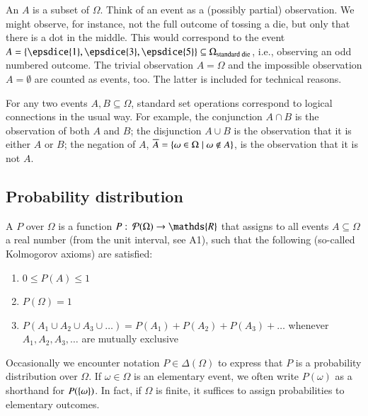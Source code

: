 \documentclass[nobib,nofonts]{tufte-handout}
\begin{document}
An  $A$ is a subset of $\Omega$. Think of an event as a (possibly partial)
observation. We might observe, for instance, not the full outcome of tossing a die, but only
that there is a dot in the middle. This would correspond to the event
$A = \set{\epsdice{1}, \epsdice{3}, \epsdice{5}} \subseteq \Omega_{\text{standard die}}$,
i.e., observing an odd numbered outcome. The trivial observation $A = \Omega$ and the
impossible observation $A = \emptyset$ are counted as events, too. The latter is included for
technical reasons.


For any two events $A, B \subseteq \Omega$, standard set operations correspond to logical
connections in the usual way. For example, the conjunction $A \cap B$ is the observation of
both $A$ and $B$; the disjunction $A \cup B$ is the observation that it is either $A$ or $B$;
the negation of $A$, $\overline{A} = \left\{\omega \in \Omega \mid \omega \not \in A\right\}$, is the
observation that it is not $A$.

\subsection{Probability distribution}

A  $P$ over $\Omega$ is a function
$P \mycolon \pow{\Omega} \rightarrow \mathds{R}$ that assigns to all events
$A \subseteq \Omega$ a real number (from the unit interval, see A1), such that the following
(so-called Kolmogorov axioms) are satisfied:
\begin{enumerate}[{A}1.]
\item $0 \le P(A) \le 1$
\item $P(\Omega) = 1$
\item $P(A_1 \cup A_2 \cup A_3 \cup \dots) = P(A_1) + P(A_2) + P(A_3) + \dots $ whenever $A_1, A_2,
  A_3, \dots$ are mutually exclusive
\end{enumerate}
Occasionally we encounter notation $P \in \Delta(\Omega)$ to express that $P$ is a probability
distribution over $\Omega$. If $\omega \in \Omega$ is an elementary event,
we often write $P(\omega)$ as a shorthand for $P(\left\{\omega\right\})$. In fact, if $\Omega$ is
finite, it suffices to assign probabilities to elementary outcomes.
\end{document}
